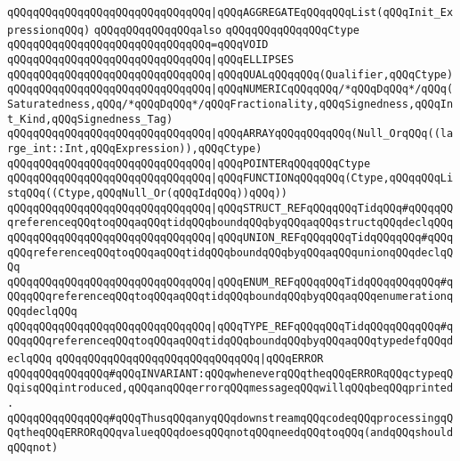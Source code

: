 \verb|qQQqqQQqqQQqqQQqqQQqqQQqqQQqqQQq|\verb#|qQQqAGGREGATEqQQqqQQqList(qQQqInit_ExpressionqQQq)#\newline
\newline
\verb|qQQqqQQqqQQqqQQqalso|\newline
\verb|qQQqqQQqqQQqqQQqCtype|\newline
\verb|qQQqqQQqqQQqqQQqqQQqqQQqqQQqqQQq=qQQqVOID|\newline
\verb|qQQqqQQqqQQqqQQqqQQqqQQqqQQqqQQq|\verb#|qQQqELLIPSES#\newline
\verb|qQQqqQQqqQQqqQQqqQQqqQQqqQQqqQQq|\verb#|qQQqQUALqQQqqQQq(Qualifier,qQQqCtype)#\newline
\verb|qQQqqQQqqQQqqQQqqQQqqQQqqQQqqQQq|\verb#|qQQqNUMERICqQQqqQQq/*qQQqDqQQq*/qQQq(Saturatedness,qQQq/*qQQqDqQQq*/qQQqFractionality,qQQqSignedness,qQQqInt_Kind,qQQqSignedness_Tag)#\newline
\verb|qQQqqQQqqQQqqQQqqQQqqQQqqQQqqQQq|\verb#|qQQqARRAYqQQqqQQqqQQq(Null_OrqQQq((large_int::Int,qQQqExpression)),qQQqCtype)#\newline
\verb|qQQqqQQqqQQqqQQqqQQqqQQqqQQqqQQq|\verb#|qQQqPOINTERqQQqqQQqCtype#\newline
\verb|qQQqqQQqqQQqqQQqqQQqqQQqqQQqqQQq|\verb#|qQQqFUNCTIONqQQqqQQq(Ctype,qQQqqQQqListqQQq((Ctype,qQQqNull_Or(qQQqIdqQQq))qQQq))#\newline
\verb|qQQqqQQqqQQqqQQqqQQqqQQqqQQqqQQq|\verb#|qQQqSTRUCT_REFqQQqqQQqTidqQQq#\verb|#qQQqqQQqreferenceqQQqtoqQQqaqQQqtidqQQqboundqQQqbyqQQqaqQQqstructqQQqdeclqQQq|\newline
\verb|qQQqqQQqqQQqqQQqqQQqqQQqqQQqqQQq|\verb#|qQQqUNION_REFqQQqqQQqTidqQQqqQQq#\verb|#qQQqqQQqreferenceqQQqtoqQQqaqQQqtidqQQqboundqQQqbyqQQqaqQQqunionqQQqdeclqQQq|\newline
\verb|qQQqqQQqqQQqqQQqqQQqqQQqqQQqqQQq|\verb#|qQQqENUM_REFqQQqqQQqTidqQQqqQQqqQQq#\verb|#qQQqqQQqreferenceqQQqtoqQQqaqQQqtidqQQqboundqQQqbyqQQqaqQQqenumerationqQQqdeclqQQq|\newline
\verb|qQQqqQQqqQQqqQQqqQQqqQQqqQQqqQQq|\verb#|qQQqTYPE_REFqQQqqQQqTidqQQqqQQqqQQq#\verb|#qQQqqQQqreferenceqQQqtoqQQqaqQQqtidqQQqboundqQQqbyqQQqaqQQqtypedefqQQqdeclqQQq|\newline
\verb|qQQqqQQqqQQqqQQqqQQqqQQqqQQqqQQq|\verb#|qQQqERROR#\newline
\newline
\verb|qQQqqQQqqQQqqQQq#qQQqINVARIANT:qQQqwheneverqQQqtheqQQqERRORqQQqctypeqQQqisqQQqintroduced,qQQqanqQQqerrorqQQqmessageqQQqwillqQQqbeqQQqprinted.|\newline
\verb|qQQqqQQqqQQqqQQq#qQQqThusqQQqanyqQQqdownstreamqQQqcodeqQQqprocessingqQQqtheqQQqERRORqQQqvalueqQQqdoesqQQqnotqQQqneedqQQqtoqQQq(andqQQqshouldqQQqnot)|\newline
